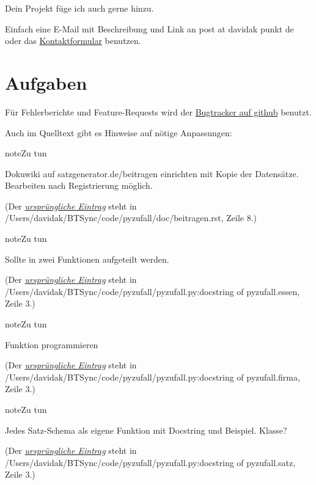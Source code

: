 \documentclass[a4paper,12pt,oneside]{sphinxmanual}
\begin{document}
Dein Projekt füge ich auch gerne hinzu.

Einfach eine E-Mail mit Beschreibung und Link an post at davidak punkt de oder das \href{http://davidak.de/kontakt}{Kontaktformular} benutzen.


\section{Aufgaben}
\label{todo::doc}\label{todo:aufgaben}
Für Fehlerberichte und Feature-Requests wird der \href{https://github.com/davidak/pyzufall/issues}{Bugtracker auf github} benutzt.

Auch im Quelltext gibt es Hinweise auf nötige Anpassungen:

\begin{notice}{note}{Zu tun}

Dokuwiki auf satzgenerator.de/beitragen einrichten mit Kopie der Datensätze. Bearbeiten nach Registrierung möglich.
\end{notice}

(Der {\hyperref[beitragen:index-0]{\emph{ursprüngliche Eintrag}}} steht in /Users/davidak/BTSync/code/pyzufall/doc/beitragen.rst, Zeile 8.)

\begin{notice}{note}{Zu tun}

Sollte in zwei Funktionen aufgeteilt werden.
\end{notice}

(Der {\hyperref[funktionen:index-0]{\emph{ursprüngliche Eintrag}}} steht in /Users/davidak/BTSync/code/pyzufall/pyzufall.py:docstring of pyzufall.essen, Zeile 3.)

\begin{notice}{note}{Zu tun}

Funktion programmieren
\end{notice}

(Der {\hyperref[funktionen:index-1]{\emph{ursprüngliche Eintrag}}} steht in /Users/davidak/BTSync/code/pyzufall/pyzufall.py:docstring of pyzufall.firma, Zeile 3.)

\begin{notice}{note}{Zu tun}

Jedes Satz-Schema als eigene Funktion mit Docstring und Beispiel. Klasse?
\end{notice}

(Der {\hyperref[funktionen:index-2]{\emph{ursprüngliche Eintrag}}} steht in /Users/davidak/BTSync/code/pyzufall/pyzufall.py:docstring of pyzufall.satz, Zeile 3.)
\end{document}
